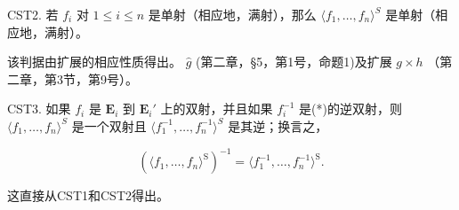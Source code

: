 CST2. 若 \(f_{i}\) 对 \(1 \leqslant i \leqslant n\) 是单射（相应地，满射），那么 \(\langle f_{1}, \ldots, f_{n} \rangle^{S}\) 是单射（相应地，满射）。

该判据由扩展的相应性质得出。 \(\hat{g}\) (第二章，§5，第1号，命题1)及扩展 \(g \times h\) （第二章，第3节，第9号）。

CST3. 如果 \(f_{i}\) 是 \(\mathbf{E}_i\) 到 \(\mathbf{E}_i'\) 上的双射，并且如果 \(f_{i}^{-1}\) 是(*)的逆双射，则 \(\langle f_1, \ldots, f_n \rangle^{S}\) 是一个双射且 \(\langle f_1^{-1}, \ldots, f_n^{-1} \rangle^{S}\) 是其逆；换言之，

\[
(\langle f _ {1}, \dots , f _ {n} \rangle^ {\mathrm{S}}) ^ {- 1} = \langle f _ {1} ^ {- 1}, \dots , f _ {n} ^ {- 1} \rangle^ {\mathrm{S}}.
\]

这直接从CST1和CST2得出。

